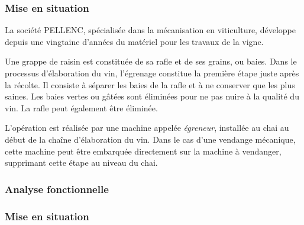 

\subsubsection*{Mise en situation}

La société PELLENC, spécialisée dans la mécanisation en viticulture, développe
depuis une vingtaine d'années du matériel pour les travaux de la vigne.

Une grappe de raisin est constituée de sa rafle et de ses grains, ou baies. Dans
le processus d'élaboration du vin, l'égrenage constitue la première étape juste
après la récolte. Il consiste à séparer les baies de la rafle et à ne conserver
que les plus saines. Les baies vertes ou gâtées sont éliminées pour ne pas nuire
à la qualité du vin. La rafle peut également être éliminée.

L'opération est réalisée par une machine appelée \emph{égreneur}, installée au
chai au début de la chaîne d'élaboration du vin. Dans le cas d'une vendange
mécanique, cette machine peut être embarquée directement sur la machine à
vendanger, supprimant cette étape au niveau du chai.


\subsubsection*{Analyse fonctionnelle}



\subsubsection*{Mise en situation}


